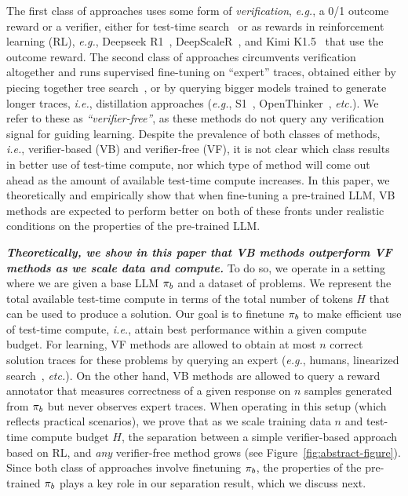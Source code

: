 The first class of approaches uses some form of \emph{verification}, \textit{e.g.}, a 0/1 outcome reward or a verifier, either for test-time search~\citep{cobbe2021training} or as rewards in reinforcement learning (RL), \textit{e.g.}, Deepseek R1~\cite{deepseekai2025deepseekr1incentivizingreasoningcapability}, DeepScaleR~\cite{deepscaler2025}, and Kimi K1.5~\cite{MoonshotAI} that use the outcome reward. The second class of approaches circumvents verification altogether and runs supervised fine-tuning on ``expert'' traces, obtained either by piecing together tree search~\cite{gandhi2024stream,moon2024guided}, or by querying bigger models trained to generate longer traces, \textit{i.e.},  distillation approaches (\textit{e.g.}, S1~\cite{muennighoff2025s1}, OpenThinker~\cite{openthoughts},
\textit{etc.}). We refer to these as \emph{``verifier-free''}, as these methods do not query any verification signal for guiding learning. Despite the prevalence of both classes of methods, \textit{i.e.}, verifier-based (VB) and verifier-free (VF), it is not clear which class results in better use of test-time compute, nor which type of method will come out ahead as the amount of available test-time compute increases. In this paper, we theoretically and empirically show that when fine-tuning a pre-trained LLM, VB methods are expected to perform better on both of these fronts under realistic conditions on the properties of the pre-trained LLM. 


\emph{\textbf{Theoretically, we show in this paper that VB methods outperform VF methods as we scale data and compute.}} To do so, we operate in a setting where we are given a base LLM $\pi_b$ and a dataset of problems. We represent the total available test-time compute in terms of the total number of tokens $H$ that can be used to produce a solution. Our goal is to finetune $\pi_b$ to make efficient use of test-time compute, \textit{i.e.}, attain best performance within a given compute budget.
For learning, VF methods are allowed to obtain at most $n$ correct solution traces for these problems by querying an expert (\textit{e.g.}, humans, linearized search~\citep{gandhi2024stream}, \textit{etc.}). On the other hand, VB methods are allowed to query a reward annotator that measures correctness of a given response on $n$ samples generated from $\pi_b$ but never observes expert traces. When operating in this setup (which reflects practical scenarios), we prove that as we scale training data $n$ and test-time compute budget $H$, the separation between a simple verifier-based approach based on RL, and \emph{any} verifier-free method grows (see Figure~\ref{fig:abstract-figure}). Since both class of approaches involve finetuning $\pi_b$, the properties of the pre-trained  $\pi_b$ plays a key role in our separation result, which we discuss next.


